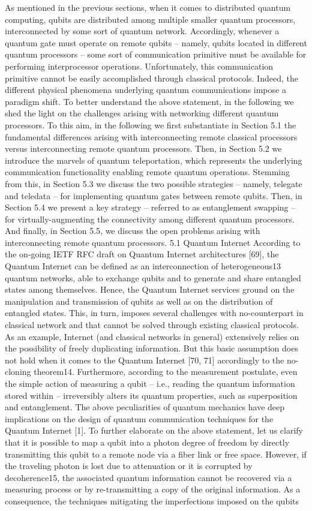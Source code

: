 As mentioned in the previous sections, when it comes to distributed quantum computing, qubits are distributed among multiple smaller quantum processors, interconnected by some sort of quantum network. Accordingly, whenever a quantum gate must operate on remote qubits – namely, qubits located in different quantum processors – some sort of communication primitive must be available for performing interprocessor operations. Unfortunately, this communication primitive cannot be easily accomplished through classical protocols. Indeed, the different physical phenomena underlying quantum communications impose a paradigm shift. To better understand the above statement, in the following we shed the light on the challenges arising with networking different quantum processors. To this aim, in the following we first substantiate in Section 5.1 the fundamental differences arising with interconnecting remote classical processors versus interconnecting remote quantum processors. Then, in Section 5.2 we introduce the marvels of quantum teleportation, which represents the underlying communication functionality enabling remote quantum operations. Stemming from this, in Section 5.3 we discuss the two possible strategies – namely, telegate and teledata – for implementing quantum gates between remote qubits. Then, in Section 5.4 we present a key strategy – referred to as entanglement swapping – for virtually-augmenting the connectivity among different quantum processors. And finally, in Section 5.5, we discuss the open problems arising with interconnecting remote quantum processors. 5.1 Quantum Internet According to the on-going IETF RFC draft on Quantum Internet architectures [69], the Quantum Internet can be defined as an interconnection of heterogeneous13 quantum networks, able to exchange qubits and to generate and share entangled states among themselves. Hence, the Quantum Internet services ground on the manipulation and transmission of qubits as well as on the distribution of entangled states. This, in turn, imposes several challenges with no-counterpart in classical network and that cannot be solved through existing classical protocols. As an example, Internet (and classical networks in general) extensively relies on the possibility of freely duplicating information. But this basic assumption does not hold when it comes to the Quantum Internet [70, 71] accordingly to the no-cloning theorem14. Furthermore, according to the measurement postulate, even the simple action of measuring a qubit – i.e., reading the quantum information stored within – irreversibly alters its quantum properties, such as superposition and entanglement. The above peculiarities of quantum mechanics have deep implications on the design of quantum communication techniques for the Quantum Internet [1]. To further elaborate on the above statement, let us clarify that it is possible to map a qubit into a photon degree of freedom by directly transmitting this qubit to a remote node via a fiber link or free space. However, if the traveling photon is lost due to attenuation or it is corrupted by decoherence15, the associated quantum information cannot be recovered via a measuring process or by re-transmitting a copy of the original information. As a consequence, the techniques mitigating the imperfections imposed on the qubits 